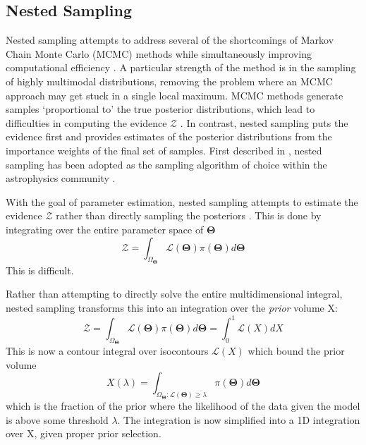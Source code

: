 \subsection{Nested Sampling}
Nested sampling attempts to address several of the shortcomings of Markov Chain Monte Carlo (MCMC) methods while simultaneously improving computational efficiency \parencite{Skilling2004}.
A particular strength of the method is in the sampling of highly multimodal distributions, removing the problem where an MCMC approach may get stuck in a single local maximum.
MCMC methods generate samples `proportional to' the true posterior distributions, which lead to difficulties in computing the evidence $\mathcal{Z}$ \parencite{Speagle2020}. 
In contrast, nested sampling puts the evidence first and provides estimates of the posterior distributions from the importance weights of the final set of samples. First described in \parencite{Skilling2004}, nested sampling has been adopted as the sampling algorithm of choice within the astrophysics community \parencite{Feroz2009,Buchner2014,Feroz2019,Speagle2020}.

With the goal of parameter estimation, nested sampling attempts to estimate the evidence $\mathcal{Z}$ rather than directly sampling the posteriors \parencite{Skilling2004}. 
This is done by integrating over the entire parameter space of $\mathbf{\Theta}$
\begin{equation}
\mathcal{Z} = \int_{\Omega_{\mathbf{\Theta}}}\mathcal{L}(\mathbf{\Theta})\pi(\mathbf{\Theta})d\mathbf{\Theta}
\end{equation}
This is difficult.

Rather than attempting to directly solve the entire multidimensional integral, nested sampling transforms this into an integration over the \textit{prior} volume X:
\begin{equation}
\mathcal{Z} = \int_{\Omega_{\mathbf{\Theta}}}\mathcal{L}(\mathbf{\Theta})\pi(\mathbf{\Theta})d\mathbf{\Theta} = \int_{0}^{1}\mathcal{L}(X)dX
\end{equation}
This is now a contour integral over isocontours $\mathcal{L}(X)$ which bound the prior volume
\begin{equation}
X(\lambda) = \int_{\Omega_{\mathbf{\Theta}}:\mathcal{L}(\mathbf{\Theta})\geq\lambda}\pi(\mathbf{\Theta})d\mathbf{\Theta}
\end{equation} 
which is the fraction of the prior where the likelihood of the data given the model is above some threshold $\lambda$.
The integration is now simplified into a 1D integration over X, given proper prior selection.

